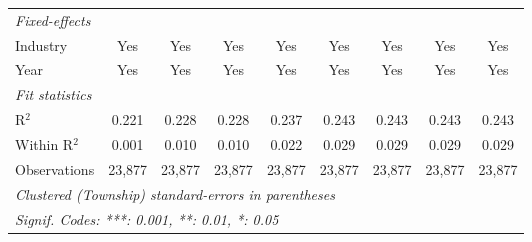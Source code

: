\begin{tabular}{lcccccccc}
   \midrule
   \emph{Fixed-effects}\\
   Industry                                              & Yes         & Yes             & Yes             & Yes             & Yes             & Yes             & Yes             & Yes\\  
   Year                                                  & Yes         & Yes             & Yes             & Yes             & Yes             & Yes             & Yes             & Yes\\  
   \midrule
   \emph{Fit statistics}\\
   R$^2$                                                 & 0.221       & 0.228           & 0.228           & 0.237           & 0.243           & 0.243           & 0.243           & 0.243\\  
   Within R$^2$                                          & 0.001       & 0.010           & 0.010           & 0.022           & 0.029           & 0.029           & 0.029           & 0.029\\  
   Observations                                          & 23,877      & 23,877          & 23,877          & 23,877          & 23,877          & 23,877          & 23,877          & 23,877\\  
   \midrule \midrule
   \multicolumn{9}{l}{\emph{Clustered (Township) standard-errors in parentheses}}\\
   \multicolumn{9}{l}{\emph{Signif. Codes: ***: 0.001, **: 0.01, *: 0.05}}\\
\end{tabular}
\par\endgroup
